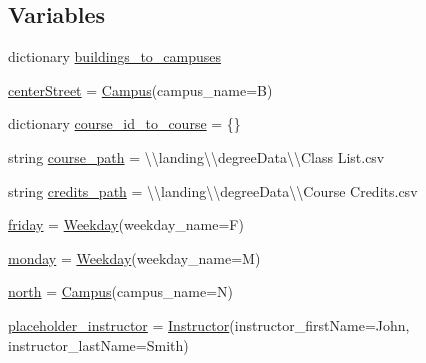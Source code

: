 \subsection*{Variables}
\begin{DoxyCompactItemize}
\item 
dictionary \mbox{\hyperlink{namespacemavAgenda_1_1CSVPreprocessing_a8d579c58a5e31d40300b86af3a85fbee}{buildings\+\_\+to\+\_\+campuses}}
\item 
\mbox{\hyperlink{namespacemavAgenda_1_1CSVPreprocessing_a70bee8b29fdeaeb2e85705af945d962b}{center\+Street}} = \mbox{\hyperlink{classmavAgenda_1_1landing_1_1models_1_1Campus}{Campus}}(campus\+\_\+name=\textquotesingle{}B\textquotesingle{})
\item 
dictionary \mbox{\hyperlink{namespacemavAgenda_1_1CSVPreprocessing_a08d29c8e6cd25f22c4198b5aaa8f856e}{course\+\_\+id\+\_\+to\+\_\+course}} = \{\}
\item 
string \mbox{\hyperlink{namespacemavAgenda_1_1CSVPreprocessing_a7508b5d8720b54268375efad733be37d}{course\+\_\+path}} = \textquotesingle{}\textbackslash{}\textbackslash{}landing\textbackslash{}\textbackslash{}degree\+Data\textbackslash{}\textbackslash{}\+Class List.\+csv\textquotesingle{}
\item 
string \mbox{\hyperlink{namespacemavAgenda_1_1CSVPreprocessing_ae2f7181cf52865e6929440b0d164d67f}{credits\+\_\+path}} = \textquotesingle{}\textbackslash{}\textbackslash{}landing\textbackslash{}\textbackslash{}degree\+Data\textbackslash{}\textbackslash{}\+Course Credits.\+csv\textquotesingle{}
\item 
\mbox{\hyperlink{namespacemavAgenda_1_1CSVPreprocessing_ae91b56837d83865dc0c5a722552a8498}{friday}} = \mbox{\hyperlink{classmavAgenda_1_1landing_1_1models_1_1Weekday}{Weekday}}(weekday\+\_\+name=\textquotesingle{}F\textquotesingle{})
\item 
\mbox{\hyperlink{namespacemavAgenda_1_1CSVPreprocessing_aff5ab6fc6ce433184d4ca55f3914f5e3}{monday}} = \mbox{\hyperlink{classmavAgenda_1_1landing_1_1models_1_1Weekday}{Weekday}}(weekday\+\_\+name=\textquotesingle{}M\textquotesingle{})
\item 
\mbox{\hyperlink{namespacemavAgenda_1_1CSVPreprocessing_ab6cf4ddc7f83f922672f170e54214548}{north}} = \mbox{\hyperlink{classmavAgenda_1_1landing_1_1models_1_1Campus}{Campus}}(campus\+\_\+name=\textquotesingle{}N\textquotesingle{})
\item 
\mbox{\hyperlink{namespacemavAgenda_1_1CSVPreprocessing_af7622418113e0566d9ed272c024fe4b5}{placeholder\+\_\+instructor}} = \mbox{\hyperlink{classmavAgenda_1_1landing_1_1models_1_1Instructor}{Instructor}}(instructor\+\_\+first\+Name=\textquotesingle{}John\textquotesingle{}, instructor\+\_\+last\+Name=\textquotesingle{}Smith\textquotesingle{})

\end{DoxyCompactItemize}
